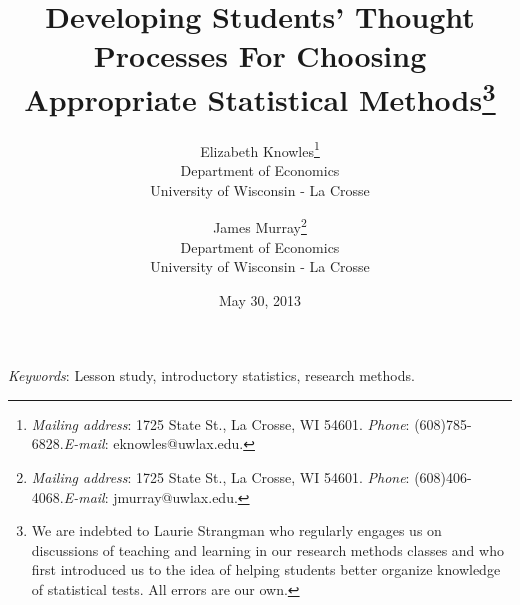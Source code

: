 \documentclass[12pt]{article}
\begin{document}
\sloppy

\begin{titlepage}
\begin{singlespace}
\title{\vspace*{-1in}Developing Students' Thought Processes For Choosing Appropriate Statistical Methods\footnote{We are indebted to Laurie Strangman who regularly engages us on discussions of teaching and learning in our research methods classes and who first introduced us to the idea of helping students better organize knowledge of statistical tests.  All errors are our own.}}
\date{May 30, 2013}
\author{
Elizabeth Knowles\footnote{\textit{Mailing address}:  1725 State St., La Crosse, WI  54601. \textit{Phone}: (608)785-6828.\newline  \textit{E-mail}: eknowles@uwlax.edu.}\\Department of Economics\\University of Wisconsin - La Crosse
\and
James Murray\footnote{\textit{Mailing address}: 1725 State St., La Crosse, WI  54601. \textit{Phone}: (608)406-4068.\newline  \textit{E-mail}: jmurray@uwlax.edu.}\\Department of Economics\\University of Wisconsin - La Crosse
}

\maketitle

\thispagestyle{empty}

\newline  

\noindent \textit{Keywords}: Lesson study, introductory statistics, research methods. \\
\end{singlespace}
\end{titlepage}
\newpage
\end{document}
